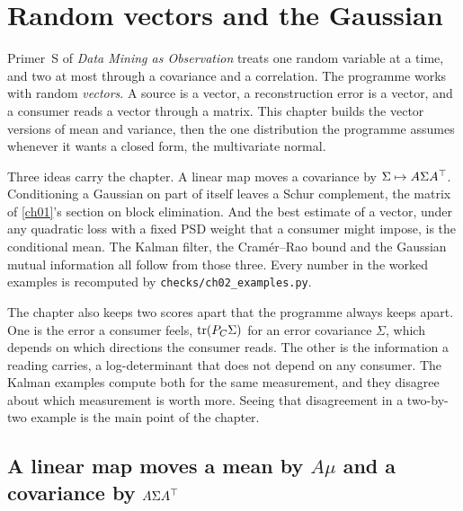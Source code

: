 \chapter{Random vectors and the Gaussian}\label{ch02}
\providecommand{\Kc}{K_c}
\let\ompSavedSectionmark\sectionmark
\providecommand{\ompnexthead}[1]{\def\ompheadtext{#1}%
  \renewcommand{\sectionmark}[1]{\markright{\MakeUppercase{\thesection.\ \ompheadtext}}}}

Primer~S of \emph{Data Mining as Observation} treats one random variable at a
time, and two at most through a covariance and a correlation. The programme
works with random \emph{vectors}. A source is a vector, a reconstruction error
is a vector, and a consumer reads a vector through a matrix. This chapter
builds the vector versions of mean and variance, then the one distribution the
programme assumes whenever it wants a closed form, the multivariate normal.

Three ideas carry the chapter. A linear map moves a covariance by
$\Sigma\mapsto A\Sigma A^{\top}$. Conditioning a Gaussian on part of itself leaves
a Schur complement, the matrix of \cref{ch01}'s section on block elimination.
And the best estimate of a vector, under any quadratic loss with a fixed PSD
weight that a consumer might impose, is the conditional mean. The Kalman filter, the Cram\'er--Rao bound and
the Gaussian mutual information all follow from those three. Every number in
the worked examples is recomputed by \texttt{checks/ch02\_examples.py}.

The chapter also keeps two scores apart that the programme always keeps apart.
One is the error a consumer feels, $\operatorname{tr}(P_C\Sigma)$ for an error covariance
$\Sigma$, which depends on which directions the consumer reads. The other is
the information a reading carries, a log-determinant that does not depend on
any consumer. The Kalman examples compute both for the same measurement, and
they disagree about which measurement is worth more. Seeing that disagreement
in a two-by-two example is the main point of the chapter.

\ompnexthead{Mean vectors and covariance matrices}
\section{A linear map moves a mean by \texorpdfstring{$A\mu$}{A mu} and a covariance by \texorpdfstring{$A\Sigma A^{\top}$}{A Sigma A transpose}}\label{sec:ch02:moments}

